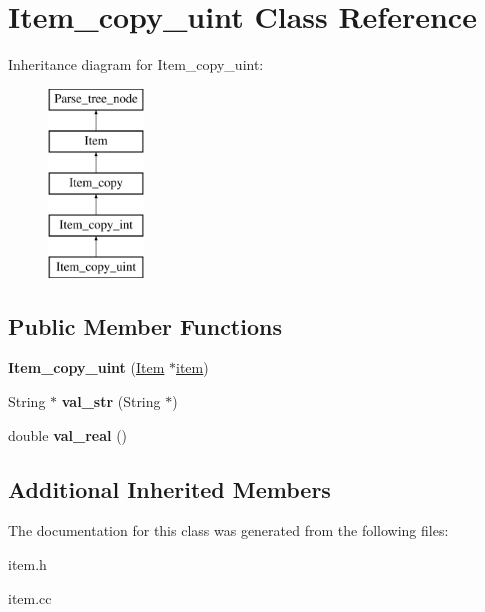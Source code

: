 \hypertarget{classItem__copy__uint}{}\section{Item\+\_\+copy\+\_\+uint Class Reference}
\label{classItem__copy__uint}
Inheritance diagram for Item\+\_\+copy\+\_\+uint\+:\begin{figure}[H]
\begin{center}
\leavevmode
\includegraphics[height=5.000000cm]{classItem__copy__uint}
\end{center}
\end{figure}
\subsection*{Public Member Functions}
\begin{DoxyCompactItemize}
\item 
\mbox{\label{classItem__copy__uint_a864f6fa627d3aceea32173ad0bde9dbc}} 
{\bfseries Item\+\_\+copy\+\_\+uint} (\mbox{\hyperlink{classItem}{Item}} $\ast$\mbox{\hyperlink{classItem__copy_a9ef1b9fd547a3b940e89e9837083c87f}{item}})
\item 
\mbox{\label{classItem__copy__uint_a1c92f26e6dc3e7346934886c5b5a630a}} 
String $\ast$ {\bfseries val\+\_\+str} (String $\ast$)
\item 
\mbox{\label{classItem__copy__uint_a75231206c233db5b029dd8f5bdab6a1f}} 
double {\bfseries val\+\_\+real} ()
\end{DoxyCompactItemize}
\subsection*{Additional Inherited Members}


The documentation for this class was generated from the following files\+:\begin{DoxyCompactItemize}
\item 
item.\+h\item 
item.\+cc\end{DoxyCompactItemize}
